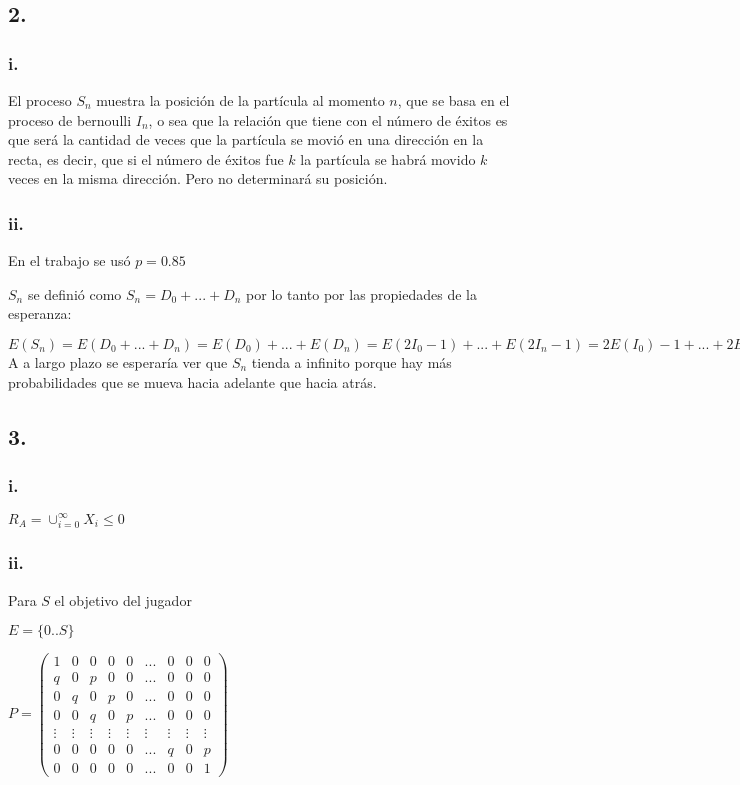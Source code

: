 \documentclass[12pt,fleqn]{article}
\begin{document}
\subsection*{2.}
\subsubsection*{i.}
El proceso $S_n$ muestra la posición de la partícula al momento $n$, que se basa en el proceso de bernoulli $I_n$, o sea que la relación que tiene con el número de éxitos es que será la cantidad de veces que la partícula se movió en una dirección en la recta, es decir, que si el número de éxitos fue $k$ la partícula se habrá movido $k$ veces en la misma dirección. Pero no determinará su posición.
\subsubsection*{ii.}
En el trabajo se usó $p=0.85$

$S_n$ se definió como $S_n=D_0+...+D_n$ por lo tanto por las propiedades de la esperanza:

$E(S_n)=E(D_0+...+D_n)=E(D_0)+...+E(D_n)=E(2I_0-1)+...+E(2I_n-1)=2E(I_0)-1+...+2E(I_n)-1=n*2*0.85-n=0.7n$\\

A a largo plazo se esperaría ver que $S_n$ tienda a infinito porque hay más probabilidades que se mueva hacia adelante que hacia atrás.
\subsection*{3.}
\subsubsection*{i.}
$R_A=\cup_{i=0}^\infty X_i\le 0$
\subsubsection*{ii.}
Para $S$ el objetivo del jugador

$E=\{0..S\}$

$P=\begin{pmatrix}
1&0&0&0&0&...&0&0&0\\
q&0&p&0&0&...&0&0&0\\
0&q&0&p&0&...&0&0&0\\
0&0&q&0&p&...&0&0&0\\
\vdots&\vdots&\vdots&\vdots&\vdots&\vdots&\vdots&\vdots&\vdots\\
0&0&0&0&0&...&q&0&p\\
0&0&0&0&0&...&0&0&1
\end{pmatrix}$
\end{document}
